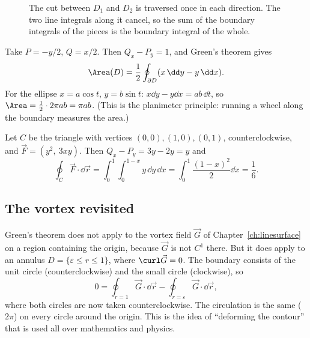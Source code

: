 \begin{figure}[ht]
\centering
{}
\caption{The cut between $D_1$ and $D_2$ is traversed once in each direction. The two line integrals along it cancel, so the sum of the boundary integrals of the pieces is the boundary integral of the whole.}
\label{fig:cutcancel}
\end{figure}

\begin{example}
Take $P=-y/2$, $Q=x/2$. Then $Q_x-P_y=1$, and Green's theorem gives
\[
\Area(D)=\frac12\oint_{\partial D}(x\,\dd y-y\,\dd x).
\]
For the ellipse $x=a\cos t$, $y=b\sin t$: $x\dd y-y\dd x=ab\,\dd t$, so $\Area=\frac12\cdot2\pi ab=\pi ab$. (This is the planimeter principle: running a wheel along the boundary measures the area.)
\end{example}

\begin{example}
Let $C$ be the triangle with vertices $(0,0),(1,0),(0,1)$, counterclockwise, and $\vec F=(y^2,\ 3xy)$. Then $Q_x-P_y=3y-2y=y$ and
\[
\oint_C\vec F\cdot\dd\vec r=\int_0^1\!\!\int_0^{1-x}y\,\dd y\,\dd x=\int_0^1\frac{(1-x)^2}2\dd x=\frac16 .
\]
\end{example}

\subsection{The vortex revisited}

Green's theorem does not apply to the vortex field $\vec G$ of Chapter~\ref{ch:linesurface} on a region containing the origin, because $\vec G$ is not $C^1$ there. But it does apply to an annulus $D=\{\varepsilon\le r\le1\}$, where $\curl\vec G=0$. The boundary consists of the unit circle (counterclockwise) and the small circle (clockwise), so
\[
0=\oint_{r=1}\vec G\cdot\dd\vec r-\oint_{r=\varepsilon}\vec G\cdot\dd\vec r,
\]
where both circles are now taken counterclockwise. The circulation is the same ($2\pi$) on every circle around the origin. This is the idea of ``deforming the contour'' that is used all over mathematics and physics.

